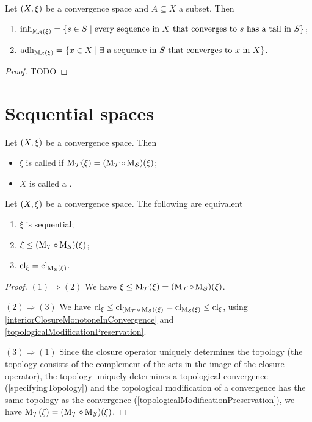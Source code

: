\begin{proposition} \label{sequentialInherenceAdherence}
Let $\sSet{X,\xi}$ be a convergence space and $A\subseteq X$ a subset. Then
\begin{enumerate}
\item $\inh_{\seqMod(\xi)} = \setbuilder{s\in S}{\text{every sequence in $X$ that converges to $s$ has a tail in $S$}}$;
\item $\adh_{\seqMod(\xi)} = \setbuilder{x\in X}{\text{$\exists$ a sequence in $S$ that converges to $x$ in $X$}}$.
\end{enumerate}
\end{proposition}
\begin{proof}
TODO
\end{proof}

\section{Sequential spaces}
\begin{definition}
Let $\sSet{X,\xi}$ be a convergence space. Then
\begin{itemize}
\item $\xi$ is called  if $\operatorname{M_\mathcal{T}}(\xi) = (\operatorname{M_\mathcal{T}}\circ \operatorname{M_\mathcal{S}})(\xi)$;
\item $X$ is called a .
\end{itemize} 
\end{definition}

\begin{lemma} \label{sequentialLemma}
Let $\sSet{X,\xi}$ be a convergence space. The following are equivalent
\begin{enumerate}
\item $\xi$ is sequential;
\item $\xi \leq (\operatorname{M_\mathcal{T}}\circ \operatorname{M_\mathcal{S}})(\xi)$;
\item $\operatorname{cl}_\xi = \operatorname{cl}_{\operatorname{M_\mathcal{S}}(\xi)}$.
\end{enumerate}
\end{lemma}
\begin{proof}
$(1) \Rightarrow (2)$ We have $\xi \leq \operatorname{M_\mathcal{T}}(\xi) = (\operatorname{M_\mathcal{T}}\circ \operatorname{M_\mathcal{S}})(\xi)$.

$(2) \Rightarrow (3)$  We have $\operatorname{cl}_\xi \leq \operatorname{cl}_{(\operatorname{M_\mathcal{T}}\circ \operatorname{M_\mathcal{S}})(\xi)} = \operatorname{cl}_{\operatorname{M_\mathcal{S}}(\xi)} \leq \operatorname{cl}_\xi$, using \ref{interiorClosureMonotoneInConvergence} and \ref{topologicalModificationPreservation}.

$(3) \Rightarrow (1)$ Since the closure operator uniquely determines the topology (the topology consists of the complement of the sets in the image of the closure operator), the topology uniquely determines a topological convergence (\ref{specifyingTopology}) and the topological modification of a convergence has the same topology as the convergence (\ref{topologicalModificationPreservation}), we have $\operatorname{M_\mathcal{T}}(\xi) = (\operatorname{M_\mathcal{T}}\circ \operatorname{M_\mathcal{S}})(\xi)$.
\end{proof}

